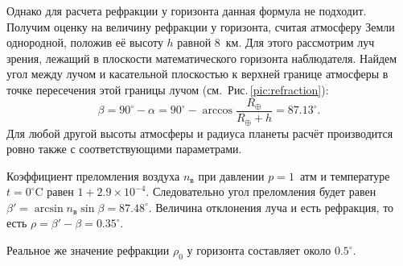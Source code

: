 Однако для расчета рефракции у горизонта данная формула не подходит. Получим оценку на величину рефракции у горизонта, считая атмосферу Земли однородной, положив её высоту $h$ равной 8~км. Для этого рассмотрим луч зрения, лежащий в плоскости математического горизонта наблюдателя. Найдем угол между лучом и касательной плоскостью к верхней границе атмосферы в точке пересечения этой границы лучом (см.~Рис.\,\ref{pic:refraction}):
\begin{equation*}
	\beta = 90^\circ - \alpha = 90^\circ - \arccos \frac{R_\oplus}{R_\oplus + h} = 87.13^\circ.
\end{equation*}
Для любой другой высоты атмосферы и радиуса планеты расчёт производится ровно также с соответствующими параметрами.

Коэффициент преломления воздуха $n_\text{в}$ при давлении $p = 1$~атм и температуре $t=0^\circ\text{C}$ равен $1 + 2.9\times 10^{-4}$. Следовательно угол преломления будет равен $\beta' = \arcsin n_\text{в} \sin \beta = 87.48^\circ$. Величина отклонения луча и есть рефракция, то есть $\rho = \beta' - \beta = 0.35^\circ$.

Реальное же значение рефракции $\rho_0$ у горизонта составляет около $0.5^\circ$.

